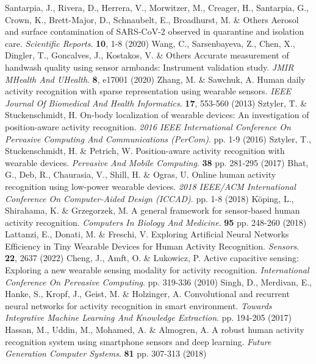 \begin{thebibliography}{99}
	Santarpia, J., Rivera, D., Herrera, V., Morwitzer, M., Creager, H., Santarpia, G., Crown, K., Brett-Major, D., Schnaubelt, E., Broadhurst, M. \& Others Aerosol and surface contamination of SARS-CoV-2 observed in quarantine and isolation care. {\em Scientific Reports}. \textbf{10}, 1-8 (2020)
    Wang, C., Sarsenbayeva, Z., Chen, X., Dingler, T., Goncalves, J., Kostakos, V. \& Others Accurate measurement of handwash quality using sensor armbands: Instrument validation study. {\em JMIR MHealth And UHealth}. \textbf{8}, e17001 (2020)
    Zhang, M. \& Sawchuk, A. Human daily activity recognition with sparse representation using wearable sensors. {\em IEEE Journal Of Biomedical And Health Informatics}. \textbf{17}, 553-560 (2013)
    Sztyler, T. \& Stuckenschmidt, H. On-body localization of wearable devices: An investigation of position-aware activity recognition. {\em 2016 IEEE International Conference On Pervasive Computing And Communications (PerCom)}. pp. 1-9 (2016)
    Sztyler, T., Stuckenschmidt, H. \& Petrich, W. Position-aware activity recognition with wearable devices. {\em Pervasive And Mobile Computing}. \textbf{38} pp. 281-295 (2017)
    Bhat, G., Deb, R., Chaurasia, V., Shill, H. \& Ogras, U. Online human activity recognition using low-power wearable devices. {\em 2018 IEEE/ACM International Conference On Computer-Aided Design (ICCAD)}. pp. 1-8 (2018)
    Köping, L., Shirahama, K. \& Grzegorzek, M. A general framework for sensor-based human activity recognition. {\em Computers In Biology And Medicine}. \textbf{95} pp. 248-260 (2018)
    Lattanzi, E., Donati, M. \& Freschi, V. Exploring Artificial Neural Networks Efficiency in Tiny Wearable Devices for Human Activity Recognition. {\em Sensors}. \textbf{22}, 2637 (2022)
    Cheng, J., Amft, O. \& Lukowicz, P. Active capacitive sensing: Exploring a new wearable sensing modality for activity recognition. {\em International Conference On Pervasive Computing}. pp. 319-336 (2010)
    Singh, D., Merdivan, E., Hanke, S., Kropf, J., Geist, M. \& Holzinger, A. Convolutional and recurrent neural networks for activity recognition in smart environment. {\em Towards Integrative Machine Learning And Knowledge Extraction}. pp. 194-205 (2017)
    Hassan, M., Uddin, M., Mohamed, A. \& Almogren, A. A robust human activity recognition system using smartphone sensors and deep learning. {\em Future Generation Computer Systems}. \textbf{81} pp. 307-313 (2018)

\end{thebibliography}
